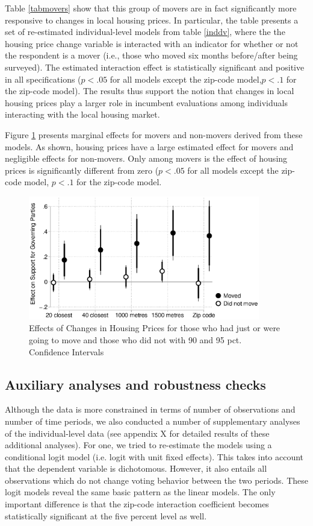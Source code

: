 \documentclass[12pt,a4paper]{article}
\begin{document}
	Table \ref{tabmovers} show that this group of movers are in fact significantly more responsive to changes in local housing prices. In particular, the table presents a set of re-estimated individual-level models from table \ref{inddv}, where the the housing price change variable is interacted with an indicator for whether or not the respondent is a mover (i.e., those who moved six months before/after being surveyed). The estimated interaction effect is statistically significant and positive in all specifications ($p<.05$ for all models except the zip-code model,$p<.1$ for the zip-code model). The results thus support the notion that  changes in local housing prices play a larger role in incumbent evaluations among individuals interacting with the local housing market.
	
	Figure \ref{move} presents marginal effects for movers and non-movers derived from these models. As shown, housing prices have a large estimated effect for movers and negligible effects for non-movers.  Only among movers is the effect of housing prices is significantly different from zero ($p<.05$ for all models except the zip-code model, $p<.1$ for the zip-code model.
	
	
	
	\begin{figure}[htbp!]
		\includegraphics[width=0.9\textwidth]{../figures/moving.eps}
		\centering
		\caption{Effects of Changes in Housing Prices for those who had just or were going to move and those who did not with 90 and 95 pct. Confidence Intervals}\label{move}
	\end{figure}
	
	
	\subsection{ Auxiliary analyses and robustness checks}
	
	Although the data is more constrained in terms of number of observations and number of time periods, we also conducted a number of supplementary analyses of the individual-level data (see appendix X for detailed results of these additional analyses). For one, we tried to re-estimate the models using a conditional logit model (i.e. logit with unit fixed effects). This takes into account that the dependent variable is dichotomous. However, it also entails all observations which do not change voting behavior between the two periods. These logit models reveal the same basic pattern as the linear models. The only important difference is that the zip-code interaction coefficient becomes statistically significant at the five percent level as well. 
	
\end{document}
